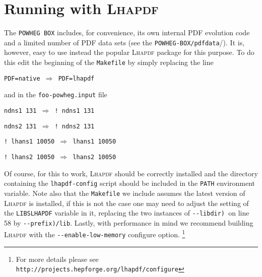 \documentclass[paper]{JHEP3}
\newcommand\POWHEGBOX{{\tt POWHEG BOX}}
\begin{document}
\section{Running with \textsc{Lhapdf}}

The \POWHEGBOX{} includes, for convenience, its own
internal PDF evolution code and a limited number of PDF data sets
(see the \texttt{POWHEG-BOX/pdfdata}/). It is, however, easy to use
instead the popular \textsc{Lhapdf} package for this purpose. To do
this edit the beginning of the \texttt{Makefile} by simply replacing
the line

\begin{center}
\texttt{PDF=native $\Rightarrow$ PDF=lhapdf}
\par\end{center}

\noindent and in the \texttt{foo-powheg.input} file

\begin{center}
\texttt{ndns1 131 $\Rightarrow$ ! ndns1 131}
\par\end{center}

\begin{center}
\texttt{ndns2 131 $\Rightarrow$ ! ndns2 131}
\par\end{center}

\begin{center}
\texttt{! lhans1 10050 $\Rightarrow$ lhans1 10050}
\par\end{center}

\begin{center}
\texttt{! lhans2 10050 $\Rightarrow$ lhans2 10050}
\par\end{center}

\noindent Of course, for this to work, \textsc{Lhapdf} should be correctly
installed and the directory containing the \texttt{lhapdf-config}
script should be included in the \texttt{PATH} environment variable.
Note also that the \texttt{Makefile} we include assumes the latest
version of \textsc{Lhapdf} is installed, if this is not the case one
may need to adjust the setting of the \texttt{LIBSLHAPDF} variable
in it, replacing the two instances of \texttt{-{}-libdir) }on line
58 by \texttt{-{}-prefix)/lib}. Lastly, with performance in mind we
recommend building \textsc{Lhapdf} with the \texttt{-{}-enable-low-memory}
configure option.%
\footnote{For more details please see \texttt{http://projects.hepforge.org/lhapdf/configure}%
}
\end{document}
